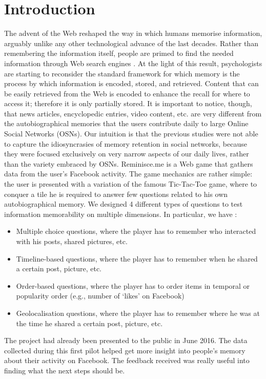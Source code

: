 \chapter*{Introduction}
The advent of the Web reshaped the way in which humans memorise information, arguably unlike any other technological advance of the last decades. Rather than remembering the information itself, people are primed to find the needed information through Web search engines \cite{googlemem} . At the light of this result, psychologists are starting to reconsider the standard framework for which memory is the process by which information is encoded, stored, and retrieved. Content that can be easily retrieved from the Web is encoded to enhance the recall for where to access it; therefore it is only partially stored. It is important to notice, though, that news articles, encyclopedic entries, video content, etc. are very different from the autobiographical memories that the users contribute daily to large Online Social Networks (OSNs). Our intuition is that the previous studies \cite{retenauto} \cite{howhappy} were not able to capture the idiosyncrasies of memory retention in social networks, because they were focused exclusively on very narrow aspects of our daily lives, rather than the variety embraced by OSNs. Reminisce.me is a Web game that gathers data from the user’s Facebook activity. The game mechanics are rather simple: the user is presented with a variation of the famous Tic-Tac-Toe game, where to conquer a tile he is required to answer few questions related to his own autobiographical memory. We designed 4 different types of questions to test information memorability on multiple
dimensions. In particular, we have :
\begin{itemize}
	\item Multiple choice questions, where the player has to remember who interacted with his posts, shared pictures, etc.
	\item Timeline-based questions, where the player has to remember when he shared a certain post, picture, etc.
	\item Order-based questions, where the player has to order items in temporal or popularity order (e.g., number of `likes' on Facebook)
	\item Geolocalisation questions, where the player has to remember where he was at the time he shared a certain post, picture, etc.
\end{itemize}
The project had already been presented to the public in June 2016. The data collected during this first pilot helped get more insight into people's memory about their activity on Facebook. The feedback received was really useful into finding what the next steps should be.\\
